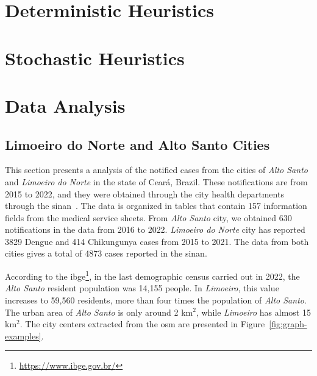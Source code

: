\section{Deterministic Heuristics}\label{sec:deterministic-heuristics}

\section{Stochastic Heuristics}\label{sec:stochastic-heuristics}

\section{Data Analysis}\label{sec:data-analysis}

\subsection{Limoeiro do Norte and Alto Santo Cities}\label{subsec:limoeiro-do-norte-and-alto-santo-cities}

This section presents a analysis of the notified cases from the cities of
\textit{Alto Santo} and \textit{Limoeiro do Norte} in the state of Ceará,
Brazil. These notifications are from 2015 to 2022, and they were obtained
through the city health departments through the
\gls{sinan}~\cite{laguardia:2004}. The data is organized in tables that contain
157 information fields from the medical service sheets. From \textit{Alto Santo}
city, we obtained 630 notifications in the data from 2016 to 2022.
\textit{Limoeiro do Norte} city has reported 3829 Dengue and 414 Chikungunya
cases from 2015 to 2021. The data from both cities gives a total of 4873 cases
reported in the \gls{sinan}.

According to the \gls{ibge}\footnote{\url{https://www.ibge.gov.br/}}, in the
last demographic census carried out in 2022, the \textit{Alto Santo} resident
population was 14,155 people. In \textit{Limoeiro}, this value increases to
59,560 residents, more than four times the population of \textit{Alto Santo}.
The urban area of \textit{Alto Santo} is only around 2 km$^2$, while
\textit{Limoeiro} has almost 15 km$^2$. The city centers extracted from the
\gls{osm} are presented in Figure~\ref{fig:graph-examples}.

